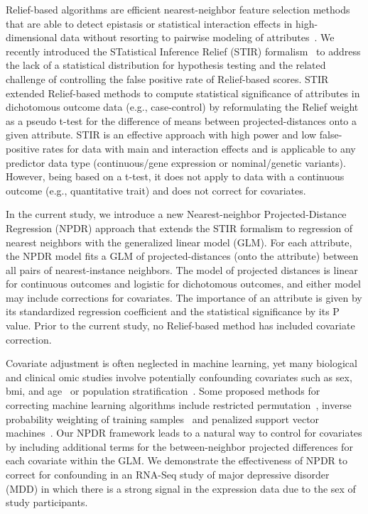 \documentclass{bioinfo}
\begin{document}
Relief-based algorithms are efficient nearest-neighbor feature selection methods that are able to detect epistasis or statistical interaction effects in high-dimensional data without resorting to pairwise modeling of attributes~\cite{urbanowicz17b, kononenko97, mckinney09, robnik2003theoretical}.
We recently introduced the STatistical Inference Relief (STIR) formalism~\cite{stir} to address the lack of a statistical distribution for hypothesis testing and the related challenge of controlling the false positive rate of Relief-based scores.
STIR extended Relief-based methods to compute statistical significance of attributes in dichotomous outcome data (e.g., case-control) by reformulating the Relief weight~\cite{mckinney13} as a pseudo t-test for the difference of means between projected-distances onto a given attribute.
STIR is an effective approach with high power and low false-positive rates for data with main and interaction effects and is applicable to any predictor data type (continuous/gene expression or nominal/genetic variants).
However, being based on a t-test, it does not apply to data with a continuous outcome (e.g., quantitative trait) and does not correct for covariates.

In the current study, we introduce a new Nearest-neighbor Projected-Distance Regression (NPDR) approach that extends the STIR formalism to regression of nearest neighbors with the generalized linear model (GLM).
For each attribute, the NPDR model fits a GLM of projected-distances (onto the attribute) between all pairs of nearest-instance neighbors.
The model of projected distances is linear for continuous outcomes and logistic for dichotomous outcomes, and either model may include corrections for covariates.
The importance of an attribute is given by its standardized regression coefficient and the statistical significance by its P value.
Prior to the current study, no Relief-based method has included covariate correction.

Covariate adjustment is often neglected in machine learning, yet many biological and clinical omic studies involve potentially confounding covariates such as sex, bmi, and age~\cite{le18_brainagesim} or population stratification~\cite{popstrat16}.
Some proposed methods for correcting machine learning algorithms include restricted permutation~\cite{rao2017}, inverse probability weighting of training samples~\cite{linn2016} and penalized support vector machines~\cite{li2011ccsvm}.
Our NPDR framework leads to a natural way to control for covariates by including additional terms for the between-neighbor projected differences for each covariate within the GLM.
We demonstrate the effectiveness of NPDR to correct for confounding in an RNA-Seq study of major depressive disorder (MDD) in which there is a strong signal in the expression data due to the sex of study participants\cite{mostafavi14}.
\end{document}
